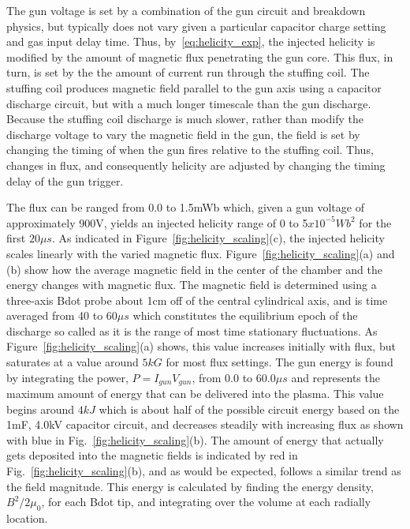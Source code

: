 \documentclass[aip,prl,amsmath,amssymb,reprint,superscriptaddress]{revtex4-1} %
\begin{document}
The gun voltage is set by a combination of the gun circuit and breakdown physics, but typically does not vary given a particular capacitor charge setting and gas input delay time. Thus, by~\ref{eq:helicity_exp}, the injected helicity is modified by the amount of magnetic flux penetrating the gun core. This flux, in turn, is set by the the amount of current run through the stuffing coil. The stuffing coil produces magnetic field parallel to the gun axis using a capacitor discharge circuit, but with a much longer timescale than the gun discharge. Because the stuffing coil discharge is much slower, rather than modify the discharge voltage to vary the magnetic field in the gun, the field is set by changing the timing of when the gun fires relative to the stuffing coil. Thus, changes in flux, and consequently helicity are adjusted by changing the timing delay of the gun trigger.

The flux can be ranged from 0.0 to 1.5mWb which, given a gun voltage of approximately 900V, yields an injected helicity range of 0 to 5$x10^{-5} Wb^{2}$ for the first $20 \mu s$. As indicated in Figure~\ref{fig:helicity_scaling}(c), the injected helicity scales linearly with the varied magnetic flux. Figure~\ref{fig:helicity_scaling}(a) and (b) show how the average magnetic field in the center of the chamber and the energy changes with magnetic flux. The magnetic field is determined using a three-axis Bdot probe about 1cm off of the central cylindrical axis, and is time averaged from 40 to 60$\mu s$ which constitutes the equilibrium epoch of the discharge so called as it is the range of most time stationary fluctuations. As Figure~\ref{fig:helicity_scaling}(a) shows, this value increases initially with flux, but saturates at a value around $5kG$ for most flux settings. The gun energy is found by integrating the power, $P = I_{gun}V_{gun}$, from 0.0 to 60.0$\mu s$ and represents the maximum amount of energy that can be delivered into the plasma. This value begins around $4kJ$ which is about half of the possible circuit energy based on the 1mF, 4.0kV capacitor circuit, and decreases steadily with increasing flux as shown with blue in Fig.~\ref{fig:helicity_scaling}(b). The amount of energy that actually gets deposited into the magnetic fields is indicated by red in Fig.~\ref{fig:helicity_scaling}(b), and as would be expected, follows a similar trend as the field magnitude. This energy is calculated by finding the energy density, $B^{2}/2\mu_{0}$, for each Bdot tip, and integrating over the volume at each radially location.
\end{document}
